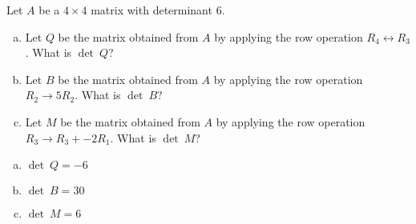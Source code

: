 
\begin{exerciseStatement}


Let \(A\) be a \(4 \times 4\) matrix with determinant \( 6 \).


\begin{enumerate}[(a)]
\item Let \(Q\) be the matrix obtained from \(A\) by applying the row operation \( R_4 \leftrightarrow R_3 \). What is \(\operatorname{det}\ Q\)?
\item Let \(B\) be the matrix obtained from \(A\) by applying the row operation \( R_2 \to 5R_2 \). What is \(\operatorname{det}\ B\)?
\item Let \(M\) be the matrix obtained from \(A\) by applying the row operation \( R_3 \to R_3 + -2R_1 \). What is \(\operatorname{det}\ M\)?
\end{enumerate}
    
\end{exerciseStatement}
    
\begin{exerciseAnswer} 

\begin{enumerate}[(a)]
\item \(\operatorname{det}\ Q= -6 \)
\item \(\operatorname{det}\ B= 30 \)
\item \(\operatorname{det}\ M= 6 \)
\end{enumerate}
    
\end{exerciseAnswer}
    
